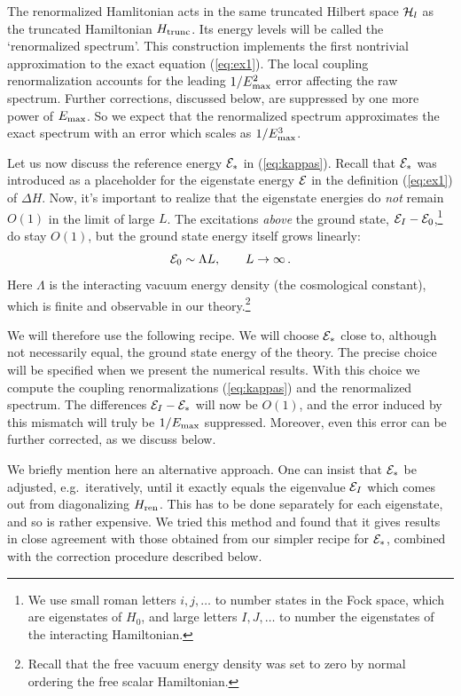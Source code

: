 \documentclass[11pt]{article}
\newcommand{\reef}[1]{(\ref{#1})}
\newcommand{\beq}{\begin{equation}}
\newcommand{\eeq}{\end{equation}}
\def\calH {{\cal H}}
\def\calE {{\cal E}}
\def \Emax{E_{\rm max}}
\def \Htr{{H_{\rm trunc}}}
\def \Er{{\calE_{\rm *}}}
\numberwithin{equation}{section}
\begin{document}
The renormalized Hamlitonian acts in the same truncated Hilbert space $\calH_l$ as the truncated Hamiltonian $\Htr$. Its energy levels will be called the `renormalized spectrum'. This construction implements the first nontrivial approximation to the exact equation \reef{eq:ex1}. The local coupling renormalization accounts for the leading $1/\Emax^2$ error affecting the raw spectrum. Further corrections, discussed below, are suppressed by one more power of $\Emax$. So we expect that the renormalized spectrum approximates the exact spectrum with an error which scales as $1/\Emax^3$. 

Let us now discuss the reference energy $\Er$ in \reef{eq:kappas}. 
Recall that $\Er$ was introduced as a placeholder for the eigenstate energy $\calE$ in the definition \reef{eq:ex1} of $\Delta H$. Now, it's important to realize that the eigenstate energies do \emph{not} remain $O(1)$ in the limit of large $L$. The excitations \emph{above} the ground state, $\calE_I-\calE_0$,\footnote{We use small roman letters $i,j,\ldots$ to number states in the Fock space, which are eigenstates of $H_0$, and large letters $I,J,\ldots$ to number the eigenstates of the interacting Hamiltonian.} do stay $O(1)$, but the ground state energy itself grows linearly:
\beq
\calE_0\sim \Lambda L,\qquad L\to \infty\,.
\label{eq:calE0}
\eeq
Here $\Lambda$ is the interacting vacuum energy density (the cosmological constant), which is finite and observable in our theory.\footnote{Recall that the free vacuum energy density was set to zero by normal ordering the free scalar Hamiltonian.} 

We will therefore use the following recipe. We will choose $\Er$ close to, although not necessarily equal, the ground state energy of the theory. The precise choice will be specified when we present the numerical results. With this choice we compute the coupling renormalizations \reef{eq:kappas} and the renormalized spectrum. The differences $\calE_{I}-\Er$ will now be $O(1)$, and the error induced by this mismatch will truly be $1/\Emax$ suppressed. Moreover, even this error can be further corrected, as we discuss below.

We briefly mention here an alternative approach. One can insist that $\Er$ be adjusted, e.g.~iteratively, until it exactly equals the eigenvalue $\calE_I$ which comes out from diagonalizing $H_{\rm ren}$. This has to be done separately for each eigenstate, and so is rather expensive. We tried this method and found that it gives results in close agreement with those obtained from our simpler recipe for $\Er$, combined with the correction procedure described below.
\end{document}
